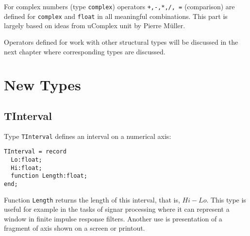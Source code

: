 \documentclass[12pt,a4paper,oneside]{report}
\newcommand{\code}[1]{\texttt{#1}}
\begin{document}
For complex numbers (type \code{complex}) operators \code{+,-,*,/, =} (comparison) are defined for \code{complex} and \code{float} in all meaningful combinations. This part is largely based on ideas from uComplex unit by Pierre Müller.

Operators defined for work with other structural types will be discussed in the next chapter where corresponding types are discussed.

\chapter{New Types}
\section{TInterval}
Type \code{TInterval} defines an interval on a numerical axis:
\begin{lstlisting}
TInterval = record
  Lo:float;
  Hi:float;
  function Length:float;
end;
\end{lstlisting}
Function \code{Length} returns the length of this interval, that is, $Hi-Lo$.
This type is useful for example in the tasks of signar processing where it can represent a window in finite impulse response filters. Another use is presentation of a fragment of axis shown on a screen or printout.
\end{document}
